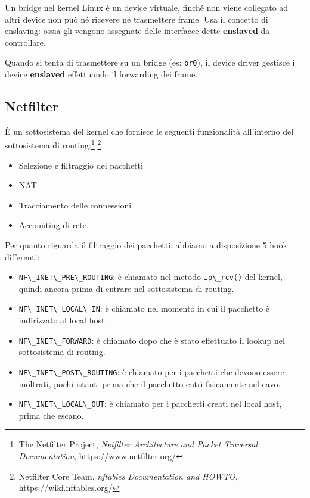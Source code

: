 Un bridge nel kernel Linux è un device virtuale, finché non viene
collegato ad altri device non può né ricevere né trasmettere frame. Usa
il concetto di enslaving: ossia gli vengono assegnate delle interfacce
dette \textbf{enslaved} da controllare.

Quando si tenta di trasmettere su un bridge (es:
\passthrough{\lstinline!br0!}), il device driver gestisce i device
\textbf{enslaved} effettuando il forwarding dei frame.

\subsection{Netfilter}\label{netfilter}

È un sottosistema del kernel che fornisce le seguenti funzionalità
all'interno del sottosistema di routing:\footnote{\label{fn:ref_25}The Netfilter Project,
  \emph{Netfilter Architecture and Packet Traversal Documentation},
  https://www.netfilter.org/} \footnote{\label{fn:ref_26}Netfilter Core Team,
  \emph{nftables Documentation and HOWTO}, https://wiki.nftables.org/}

\begin{itemize}
\tightlist
\item
  Selezione e filtraggio dei pacchetti
\item
  NAT
\item
  Tracciamento delle connessioni
\item
  Accounting di rete.
\end{itemize}

Per quanto riguarda il filtraggio dei pacchetti, abbiamo a disposizione
5 hook differenti:

\begin{itemize}
\tightlist
\item
  \passthrough{\lstinline!NF\_INET\_PRE\_ROUTING!}: è chiamato nel
  metodo \passthrough{\lstinline!ip\_rcv()!} del kernel, quindi ancora
  prima di entrare nel sottosistema di routing.
\item
  \passthrough{\lstinline!NF\_INET\_LOCAL\_IN!}: è chiamato nel momento
  in cui il pacchetto è indirizzato al local host.
\item
  \passthrough{\lstinline!NF\_INET\_FORWARD!}: è chiamato dopo che è
  stato effettuato il lookup nel sottosistema di routing.
\item
  \passthrough{\lstinline!NF\_INET\_POST\_ROUTING!}: è chiamato per i
  pacchetti che devono essere inoltrati, pochi istanti prima che il
  pacchetto entri fisicamente nel cavo.
\item
  \passthrough{\lstinline!NF\_INET\_LOCAL\_OUT!}: è chiamato per i
  pacchetti creati nel local host, prima che escano.
\end{itemize}

